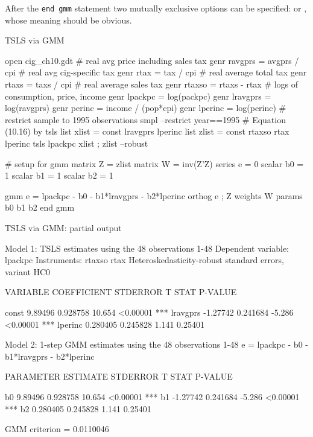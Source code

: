 After the \texttt{end gmm} statement two mutually
exclusive options can be specified:  or
, whose meaning should be obvious.

\begin{script}[htbp]
  \caption{TSLS via GMM}
  \label{gmm-tsls-ex}
\begin{scode}
open cig_ch10.gdt
# real avg price including sales tax
genr ravgprs = avgprs / cpi
# real avg cig-specific tax
genr rtax = tax / cpi
# real average total tax
genr rtaxs = taxs / cpi
# real average sales tax
genr rtaxso = rtaxs - rtax
# logs of consumption, price, income
genr lpackpc = log(packpc)
genr lravgprs = log(ravgprs)
genr perinc = income / (pop*cpi)
genr lperinc = log(perinc)
# restrict sample to 1995 observations
smpl --restrict year==1995
# Equation (10.16) by tsls
list xlist = const lravgprs lperinc
list zlist = const rtaxso rtax lperinc
tsls lpackpc xlist ; zlist --robust

# setup for gmm
matrix Z = { zlist }
matrix W = inv(Z'Z)
series e = 0
scalar b0 = 1
scalar b1 = 1
scalar b2 = 1

gmm e = lpackpc - b0 - b1*lravgprs - b2*lperinc
  orthog e ; Z
  weights W
  params b0 b1 b2
end gmm 
\end{scode}
\end{script}

\begin{script}[htbp]
  \caption{TSLS via GMM: partial output}
  \label{gmm-tsls-out}
\begin{code}
Model 1: TSLS estimates using the 48 observations 1-48
Dependent variable: lpackpc
Instruments: rtaxso rtax 
Heteroskedasticity-robust standard errors, variant HC0

      VARIABLE       COEFFICIENT        STDERROR      T STAT   P-VALUE

  const                 9.89496          0.928758     10.654  <0.00001 ***
  lravgprs             -1.27742          0.241684     -5.286  <0.00001 ***
  lperinc               0.280405         0.245828      1.141   0.25401

Model 2: 1-step GMM estimates using the 48 observations 1-48
e = lpackpc - b0 - b1*lravgprs - b2*lperinc

      PARAMETER       ESTIMATE          STDERROR      T STAT   P-VALUE

  b0                    9.89496          0.928758     10.654  <0.00001 ***
  b1                   -1.27742          0.241684     -5.286  <0.00001 ***
  b2                    0.280405         0.245828      1.141   0.25401

  GMM criterion = 0.0110046
\end{code}
\end{script}


